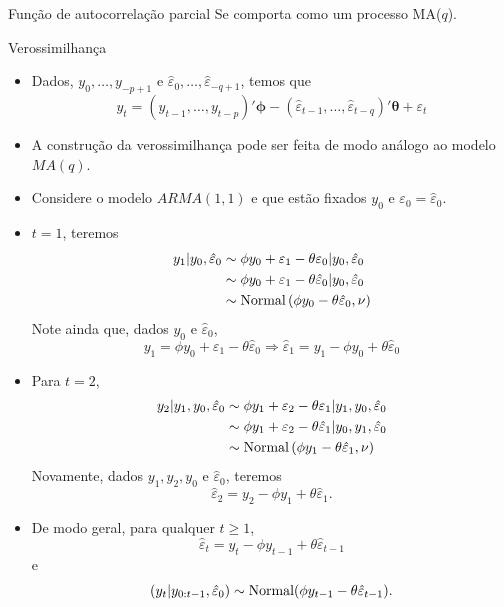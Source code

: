 \documentclass[
  letterpaper,
  DIV=11,
  numbers=noendperiod]{scrartcl}
\theoremstyle{definition}
\theoremstyle{definition}
\theoremstyle{plain}
\theoremstyle{plain}
\theoremstyle{remark}
\begin{document}
\begin{frame}{Função de autocorrelação parcial}
    Se comporta como um processo MA($q$).
\end{frame}

\begin{frame}{Verossimilhança}
    \begin{itemize}
        \item Dados, $y_{0},\ldots,y_{-p+1}$ e $\hat{\varepsilon}_0,\ldots,\hat{\varepsilon}_{-q+1}$, temos que
            $$y_t=(y_{t-1},\ldots,y_{t-p})'\bm{\phi} -(\hat{\varepsilon}_{t-1},\ldots,\hat{\varepsilon}_{t-q} )'\bm{\theta}+\varepsilon_t$$
        \item A construção da verossimilhança pode ser feita de modo análogo ao modelo $MA(q)$.
        \item Considere o modelo $ARMA(1,1)$ e que estão fixados $y_0$ e $\varepsilon_0=\hat{\varepsilon}_0$.
        \item $t=1$, teremos 
        \begin{align*}
        y_1|y_0,\hat{\varepsilon}_0 &\sim \phi y_0 + \varepsilon_1-\theta\varepsilon_0|y_0,\hat{\varepsilon}_0 \\
        &\sim \phi y_0 + \varepsilon_1-\theta\hat{\varepsilon}_0|y_0,\hat{\varepsilon}_0\\
        &\sim \hbox{Normal}\left(\phi y_0 -\theta\hat{\varepsilon}_0, \nu\right)
        \end{align*}
        Note ainda que, dados $y_0$ e $\hat{\varepsilon}_0$,
        $$y_1=\phi y_0+\varepsilon_1-\theta \hat{\varepsilon}_{0}\Rightarrow \hat{\varepsilon}_1=y_1 - \phi y_0 + \theta\hat{\varepsilon}_0$$       
    \end{itemize}   
\end{frame}

\begin{frame}
    \begin{itemize}
        \item Para $t=2$,
        \begin{align*}
        y_2|y_1,y_0,\hat{\varepsilon}_0 &\sim \phi y_1 + \varepsilon_2-\theta\varepsilon_1|y_1,y_0,\hat{\varepsilon}_0 \\
        &\sim \phi y_1 + \varepsilon_2-\theta\hat{\varepsilon}_1|y_0,y_1,\hat{\varepsilon}_0\\
        &\sim \hbox{Normal}\left(\phi y_1 -\theta\hat{\varepsilon}_1, \nu\right)
        \end{align*}
        Novamente, dados $y_1,y_2,y_0$ e $\hat{\varepsilon}_0$, teremos
        $$\hat{\varepsilon}_2=y_2 - \phi y_1 + \theta\hat{\varepsilon}_1.$$     
        \item De modo geral, para qualquer $t\geq 1$,
        $$\hat{\varepsilon}_t= y_t - \phi y_{t-1} + \theta \hat{\varepsilon}_{t-1}$$
        e
        $$(y_t|y_{0:t-1},\hat{\varepsilon}_0)\sim\hbox{Normal}( \phi y_{t-1} - \theta \hat{\varepsilon}_{t-1}).$$
        
    \end{itemize}   
\end{frame}
\end{document}
